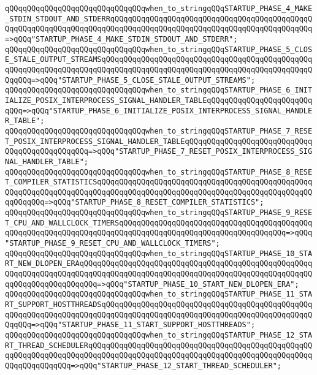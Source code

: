 \verb|qQQqqQQqqQQqqQQqqQQqqQQqqQQqqQQqwhen_to_stringqQQqSTARTUP_PHASE_4_MAKE_STDIN_STDOUT_AND_STDERRqQQqqQQqqQQqqQQqqQQqqQQqqQQqqQQqqQQqqQQqqQQqqQQqqQQqqQQqqQQqqQQqqQQqqQQqqQQqqQQqqQQqqQQqqQQqqQQqqQQqqQQqqQQqqQQqqQQq=>qQQq"STARTUP_PHASE_4_MAKE_STDIN_STDOUT_AND_STDERR";|\newline
\verb|qQQqqQQqqQQqqQQqqQQqqQQqqQQqqQQqwhen_to_stringqQQqSTARTUP_PHASE_5_CLOSE_STALE_OUTPUT_STREAMSqQQqqQQqqQQqqQQqqQQqqQQqqQQqqQQqqQQqqQQqqQQqqQQqqQQqqQQqqQQqqQQqqQQqqQQqqQQqqQQqqQQqqQQqqQQqqQQqqQQqqQQqqQQqqQQqqQQqqQQqqQQq=>qQQq"STARTUP_PHASE_5_CLOSE_STALE_OUTPUT_STREAMS";|\newline
\verb|qQQqqQQqqQQqqQQqqQQqqQQqqQQqqQQqwhen_to_stringqQQqSTARTUP_PHASE_6_INITIALIZE_POSIX_INTERPROCESS_SIGNAL_HANDLER_TABLEqQQqqQQqqQQqqQQqqQQqqQQqqQQq=>qQQq"STARTUP_PHASE_6_INITIALIZE_POSIX_INTERPROCESS_SIGNAL_HANDLER_TABLE";|\newline
\verb|qQQqqQQqqQQqqQQqqQQqqQQqqQQqqQQqwhen_to_stringqQQqSTARTUP_PHASE_7_RESET_POSIX_INTERPROCESS_SIGNAL_HANDLER_TABLEqQQqqQQqqQQqqQQqqQQqqQQqqQQqqQQqqQQqqQQqqQQqqQQq=>qQQq"STARTUP_PHASE_7_RESET_POSIX_INTERPROCESS_SIGNAL_HANDLER_TABLE";|\newline
\verb|qQQqqQQqqQQqqQQqqQQqqQQqqQQqqQQqwhen_to_stringqQQqSTARTUP_PHASE_8_RESET_COMPILER_STATISTICSqQQqqQQqqQQqqQQqqQQqqQQqqQQqqQQqqQQqqQQqqQQqqQQqqQQqqQQqqQQqqQQqqQQqqQQqqQQqqQQqqQQqqQQqqQQqqQQqqQQqqQQqqQQqqQQqqQQqqQQqqQQqqQQq=>qQQq"STARTUP_PHASE_8_RESET_COMPILER_STATISTICS";|\newline
\verb|qQQqqQQqqQQqqQQqqQQqqQQqqQQqqQQqwhen_to_stringqQQqSTARTUP_PHASE_9_RESET_CPU_AND_WALLCLOCK_TIMERSqQQqqQQqqQQqqQQqqQQqqQQqqQQqqQQqqQQqqQQqqQQqqQQqqQQqqQQqqQQqqQQqqQQqqQQqqQQqqQQqqQQqqQQqqQQqqQQqqQQqqQQqqQQq=>qQQq"STARTUP_PHASE_9_RESET_CPU_AND_WALLCLOCK_TIMERS";|\newline
\verb|qQQqqQQqqQQqqQQqqQQqqQQqqQQqqQQqwhen_to_stringqQQqSTARTUP_PHASE_10_START_NEW_DLOPEN_ERAqQQqqQQqqQQqqQQqqQQqqQQqqQQqqQQqqQQqqQQqqQQqqQQqqQQqqQQqqQQqqQQqqQQqqQQqqQQqqQQqqQQqqQQqqQQqqQQqqQQqqQQqqQQqqQQqqQQqqQQqqQQqqQQqqQQqqQQqqQQqqQQq=>qQQq"STARTUP_PHASE_10_START_NEW_DLOPEN_ERA";|\newline
\verb|qQQqqQQqqQQqqQQqqQQqqQQqqQQqqQQqwhen_to_stringqQQqSTARTUP_PHASE_11_START_SUPPORT_HOSTTHREADSqQQqqQQqqQQqqQQqqQQqqQQqqQQqqQQqqQQqqQQqqQQqqQQqqQQqqQQqqQQqqQQqqQQqqQQqqQQqqQQqqQQqqQQqqQQqqQQqqQQqqQQqqQQqqQQqqQQqqQQqqQQq=>qQQq"STARTUP_PHASE_11_START_SUPPORT_HOSTTHREADS";|\newline
\verb|qQQqqQQqqQQqqQQqqQQqqQQqqQQqqQQqwhen_to_stringqQQqSTARTUP_PHASE_12_START_THREAD_SCHEDULERqQQqqQQqqQQqqQQqqQQqqQQqqQQqqQQqqQQqqQQqqQQqqQQqqQQqqQQqqQQqqQQqqQQqqQQqqQQqqQQqqQQqqQQqqQQqqQQqqQQqqQQqqQQqqQQqqQQqqQQqqQQqqQQqqQQqqQQq=>qQQq"STARTUP_PHASE_12_START_THREAD_SCHEDULER";|\newline

